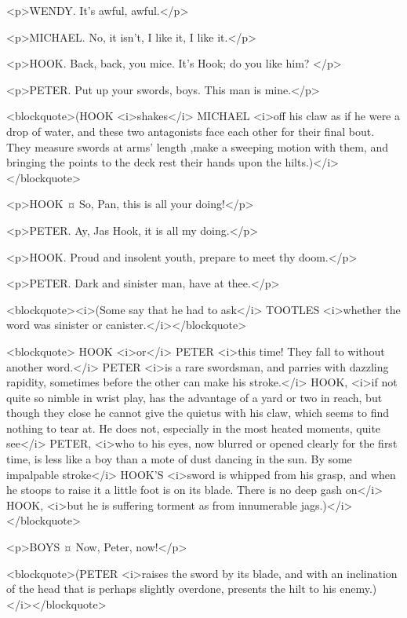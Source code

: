 <p>WENDY. It's awful, awful.</p>

<p>MICHAEL. No, it isn't, I like it, I like it.</p>


<p>HOOK. Back, back, you mice. It's Hook; do you like him?
</p>

<p>PETER. Put up your swords, boys. This man is mine.</p>

<blockquote>(HOOK <i>shakes</i> MICHAEL <i>off his claw as if he were a drop of water, and these two antagonists face each other for their final bout. They measure swords at arms' length ,make a sweeping motion with them, and bringing the points to the deck rest their hands upon the hilts.)</i></blockquote>

<p>HOOK ¤
So, Pan, this is all your doing!</p>

<p>PETER. Ay, Jas Hook, it is all my doing.</p>

<p>HOOK. Proud and insolent youth, prepare to meet thy doom.</p>

<p>PETER. Dark and sinister man, have at thee.</p>

<blockquote><i>(Some say that he had to ask</i> TOOTLES <i>whether the word was sinister or canister.</i></blockquote>

<blockquote> HOOK <i>or</i> PETER <i>this time! They fall to without another word.</i> PETER <i>is a rare swordsman, and parries with dazzling rapidity, sometimes before the other can make his stroke.</i> HOOK, <i>if not quite so nimble in wrist play, has the advantage of a yard or two in reach, but though they close he cannot give the quietus with his claw, which seems to find nothing to tear at. He does not, especially in the most heated moments, quite see</i> PETER, <i>who to his eyes, now blurred or opened clearly for the first time, is less like a boy than a mote of dust dancing in the sun. By some impalpable stroke</i> HOOK'S <i>sword is whipped from his grasp, and when he stoops to raise it a little foot is on its blade. There is no deep gash on</i> HOOK, <i>but he is suffering torment as from innumerable jags.)</i></blockquote>

<p>BOYS ¤
Now, Peter, now!</p>

<blockquote>(PETER <i>raises the sword by its blade, and with an inclination of the head that is perhaps slightly overdone, presents the hilt to his enemy.)</i></blockquote>


